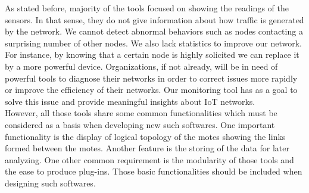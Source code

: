 As stated before, majority of the tools focused on showing the readings of the sensors. In that sense, they do not give information about how traffic is generated by the network. We cannot detect abnormal behaviors such as nodes contacting a surprising number of other nodes. We also lack statistics to improve our network. For instance, by knowing that a certain node is highly solicited we can replace it by a more powerful device. Organizations, if not already, will be in need of powerful tools to diagnose their networks in order to correct issues more rapidly or improve the efficiency of their networks. Our monitoring tool has as a goal to solve this issue and provide meaningful insights about IoT networks. \\

However, all those tools share some common functionalities which must be considered as a basis when developing new such softwares. One important functionality is the display of logical topology of the motes showing the links formed between the motes. Another feature is the storing of the data for later analyzing. One other common requirement is the modularity of those tools and the ease to produce plug-ins. Those basic functionalities should be included when designing such softwares.

